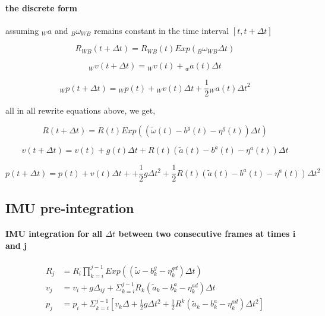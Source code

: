 \documentclass[10pt,a4paper]{article}
\begin{document}
\paragraph{the discrete form}
assuming ${_W}a$ and $_B\omega_{WB}$ remains constant in the time interval ${[t, {t+\Delta t}]}$

\begin{equation}
R_{WB}(t+\Delta t) = R_{WB}(t) Exp(_B \omega_{WB} \Delta t)
\end{equation}

\begin{equation}
{_W}v(t+\Delta t) = {_W}v(t) + {_w}a(t)\Delta t
\end{equation}

\begin{equation}
{_W}p(t+\Delta t) = {_W}p(t) + {_W}v(t)\Delta t + \frac{1}{2} {_W}a(t) {\Delta t}^2
\end{equation}

all in all rewrite equations above, we get,

\begin{equation}
R(t+\Delta t) = R(t) Exp(( \tilde{\omega}(t) - b^g(t) - \eta^g(t)) \Delta t)
\end{equation}

\begin{equation}
v(t+\Delta t) =v(t) + g(t) \Delta t + R(t)(\tilde{a}(t) -b^a(t) - \eta^a(t)) \Delta t
\end{equation}

\begin{equation}
p(t+\Delta t) = p(t) + v(t)\Delta t + + \frac{1}{2}g\Delta t^2
 + \frac{1}{2} R(t)(\tilde{a}(t) -b^a(t) - \eta^a(t)) \Delta t^2
\end{equation}

\subsection{IMU pre-integration}

\paragraph{IMU integration for all $\Delta t$ between two consecutive frames at times i and j}
\begin{subequations}
\begin{align}
	R_j &= R_i \prod_{k=i}^{j-1} Exp((\tilde{\omega} - b^g_k - \eta^{gd}_k) \Delta t) \\
	v_j &= v_i + g\Delta_{ij} + \Sigma_{k=i}^{j-1} R_k(\tilde{a}_k - b_k^a - \eta_k^{ad}) \Delta t \\
	p_j &= p_i + \Sigma_{k=i}^{j-1}[v_k\Delta + \frac{1}{2}g \Delta t^2 +
	\frac{1}{2} R^k (\tilde{a}_k - b_k^a - \eta_k^{ad}) \Delta t^2]
\end{align}
\end{subequations}
\end{document}
